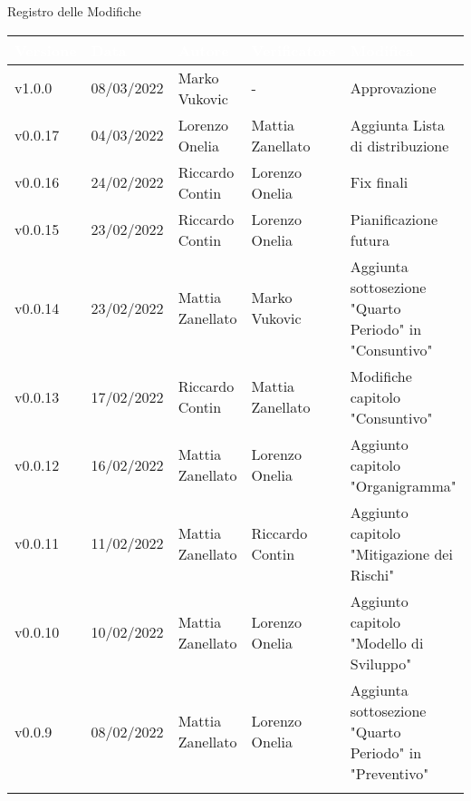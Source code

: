 \begin{center}
  \huge{Registro delle Modifiche}
\end{center}
\renewcommand\arraystretch{1,5}
{\centering
\begin{longtable}{|C{1.8cm}|C{2.1cm}|C{2cm}|C{2.4cm}|L{4.4cm}|}
  \hline
  \textcolor[HTML]{FFFFFF}{\textbf{Versione}} & \textcolor[HTML]{FFFFFF}{\textbf{Data}} & \textcolor[HTML]{FFFFFF}{\textbf{Autore}}  & \textcolor[HTML]{FFFFFF}{\textbf{Verificatore}} & \textcolor[HTML]{FFFFFF}{\textbf{Modifica}}    \\ \hline
  v1.0.0        & 08/03/2022    & Marko Vukovic   &  -                 & Approvazione \\ \hline
  v0.0.17       & 04/03/2022    & Lorenzo Onelia  & Mattia Zanellato     & Aggiunta Lista di distribuzione                  \\ \hline
  v0.0.16       & 24/02/2022     & Riccardo Contin  & Lorenzo Onelia                                & Fix finali \\ \hline
  v0.0.15       & 23/02/2022    & Riccardo Contin   & Lorenzo Onelia                  & Pianificazione futura \\ \hline
  v0.0.14       & 23/02/2022    & Mattia Zanellato  & Marko Vukovic                   & Aggiunta sottosezione "Quarto Periodo" in "Consuntivo" \\ \hline
  v0.0.13       & 17/02/2022    & Riccardo Contin   & Mattia Zanellato                & Modifiche capitolo "Consuntivo" \\ \hline
  v0.0.12       & 16/02/2022    & Mattia Zanellato  & Lorenzo Onelia                  & Aggiunto capitolo "Organigramma" \\ \hline
  v0.0.11       & 11/02/2022    & Mattia Zanellato  & Riccardo Contin                 & Aggiunto capitolo "Mitigazione dei Rischi" \\ \hline
  v0.0.10       & 10/02/2022    & Mattia Zanellato  & Lorenzo Onelia                  & Aggiunto capitolo "Modello di Sviluppo" \\ \hline
  v0.0.9        & 08/02/2022    & Mattia Zanellato  & Lorenzo Onelia                  & Aggiunta sottosezione "Quarto Periodo" in "Preventivo" \\ \hline

\end{longtable}}
